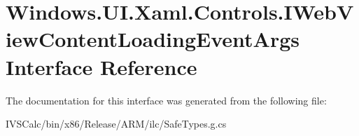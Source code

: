 \hypertarget{interface_windows_1_1_u_i_1_1_xaml_1_1_controls_1_1_i_web_view_content_loading_event_args}{}\section{Windows.\+U\+I.\+Xaml.\+Controls.\+I\+Web\+View\+Content\+Loading\+Event\+Args Interface Reference}
\label{interface_windows_1_1_u_i_1_1_xaml_1_1_controls_1_1_i_web_view_content_loading_event_args}


The documentation for this interface was generated from the following file\+:\begin{DoxyCompactItemize}
\item 
I\+V\+S\+Calc/bin/x86/\+Release/\+A\+R\+M/ilc/Safe\+Types.\+g.\+cs\end{DoxyCompactItemize}
